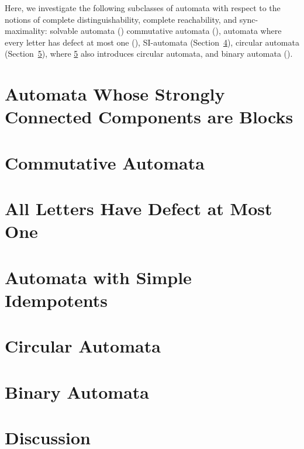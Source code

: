 
Here, we investigate the following subclasses of automata with respect to the notions
of complete distinguishability, complete reachability,
and sync-maximality: solvable automata () 
commutative automata (), automata where every letter has defect at most one (), SI-automata (Section~\ref{sync_max:sec:SI}),
circular automata (Section~\ref{sync_max:sec:circular}), where \cref{sync_max:sec:circular} 
also introduces circular automata, and binary automata ().

\section{Automata Whose Strongly Connected Components are Blocks}
\label{sync_max:sec:blocks}



\section{Commutative Automata}
\label{sync_max:sec:comm}



\section{All Letters Have Defect at Most One}
\label{sync_max:sec:defectone}



\section{Automata with Simple Idempotents}
\label{sync_max:sec:SI}



\section{Circular Automata}
\label{sync_max:sec:circular}



\section{Binary Automata}
\label{sync_max:sec:binary}



\section{Discussion}
\label{sync_max:sec:subclasses:discussion}

